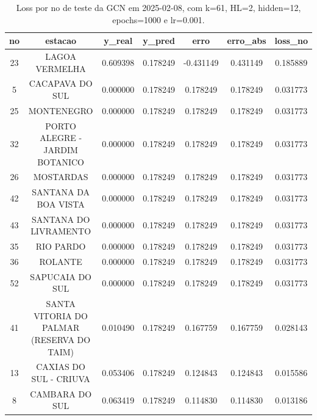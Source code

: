 \begin{table}[h]
\centering
\caption{Loss por no de teste da GCN em 2025-02-08, com k=61, HL=2, hidden=12, epochs=1000 e lr=0.001.}
\label{tab:gcn_loss_k61_hl2_h12_e1000_d20250208}
\begin{tabular}{ccccccc}
\toprule
no & estacao & y\_real & y\_pred & erro & erro\_abs & loss\_no \\
\midrule
23 & LAGOA VERMELHA & 0.609398 & 0.178249 & -0.431149 & 0.431149 & 0.185889 \\
5 & CACAPAVA DO SUL & 0.000000 & 0.178249 & 0.178249 & 0.178249 & 0.031773 \\
25 & MONTENEGRO & 0.000000 & 0.178249 & 0.178249 & 0.178249 & 0.031773 \\
32 & PORTO ALEGRE - JARDIM BOTANICO & 0.000000 & 0.178249 & 0.178249 & 0.178249 & 0.031773 \\
26 & MOSTARDAS & 0.000000 & 0.178249 & 0.178249 & 0.178249 & 0.031773 \\
42 & SANTANA DA BOA VISTA & 0.000000 & 0.178249 & 0.178249 & 0.178249 & 0.031773 \\
43 & SANTANA DO LIVRAMENTO & 0.000000 & 0.178249 & 0.178249 & 0.178249 & 0.031773 \\
35 & RIO PARDO & 0.000000 & 0.178249 & 0.178249 & 0.178249 & 0.031773 \\
36 & ROLANTE & 0.000000 & 0.178249 & 0.178249 & 0.178249 & 0.031773 \\
52 & SAPUCAIA DO SUL & 0.000000 & 0.178249 & 0.178249 & 0.178249 & 0.031773 \\
41 & SANTA VITORIA DO PALMAR (RESERVA DO TAIM) & 0.010490 & 0.178249 & 0.167759 & 0.167759 & 0.028143 \\
13 & CAXIAS DO SUL - CRIUVA & 0.053406 & 0.178249 & 0.124843 & 0.124843 & 0.015586 \\
8 & CAMBARA DO SUL & 0.063419 & 0.178249 & 0.114830 & 0.114830 & 0.013186 \\
\bottomrule
\end{tabular}
\end{table}
